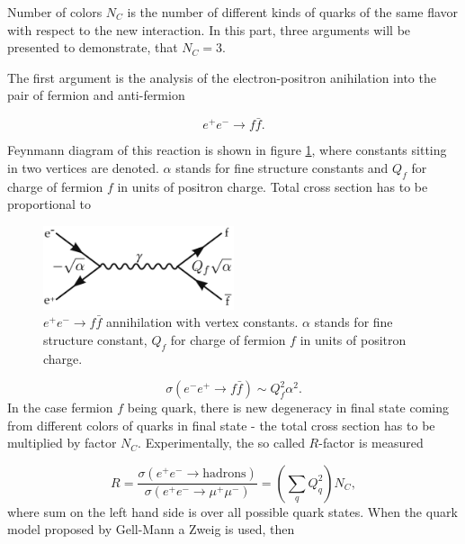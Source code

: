 \documentclass[a4paper,11pt]{report}
\begin{document}
Number of colors $N_C$ is the number of different kinds of quarks of the same
flavor with respect to the new interaction. In this part, three arguments will
be presented to demonstrate, that $N_C = 3$.

The first argument is the analysis of the electron-positron anihilation into the
pair of fermion and anti-fermion

\begin{equation}
  e^+e^- \rightarrow f\bar{f}.
  \label{ElectronPositronAnihilation}
\end{equation}

Feynmann diagram of this reaction is shown in figure \ref{fig:RRatio}, where
constants sitting in two vertices are denoted.  $\alpha$ stands for fine
structure constants and $Q_f$ for charge of fermion $f$ in units of positron
charge. Total cross section has to be proportional to

\begin{figure}[t]
  \centering
  \includegraphics[width=0.5\textwidth]{Chapter1/RRatio.png} 
  \caption{$e^+e^- \rightarrow f\bar{f}$ annihilation with vertex constants.
     $\alpha$ stands for fine structure constant, $Q_f$ for charge of fermion $f$
     in units of positron charge.}
  \label{fig:RRatio}
\end{figure}

\begin{equation}
  \sigma (e^- e^+ \rightarrow f \bar{f} ) \sim Q_f^2 \alpha^2.
  \label{eq:NumberOfColorsBasicCrossSection}
\end{equation}
In the case fermion $f$ being quark, there is new degeneracy in final state
coming from different colors of quarks in final state - the total cross section
has to be multiplied by factor $N_C$. Experimentally, the so called $R$-factor
is measured

\begin{equation}
  R = \frac{\sigma(e^+ e^- \rightarrow \text{hadrons})}{\sigma(e^+ e^-
  \rightarrow \mu^+ \mu^-)} = \left( \sum_q Q_q^2 \right) N_C,
  \label{eq:NumberOfColorsRatio}
\end{equation}
where sum on the left hand side is over all possible quark states. When the
quark model proposed by Gell-Mann a Zweig is used, then
\end{document}
